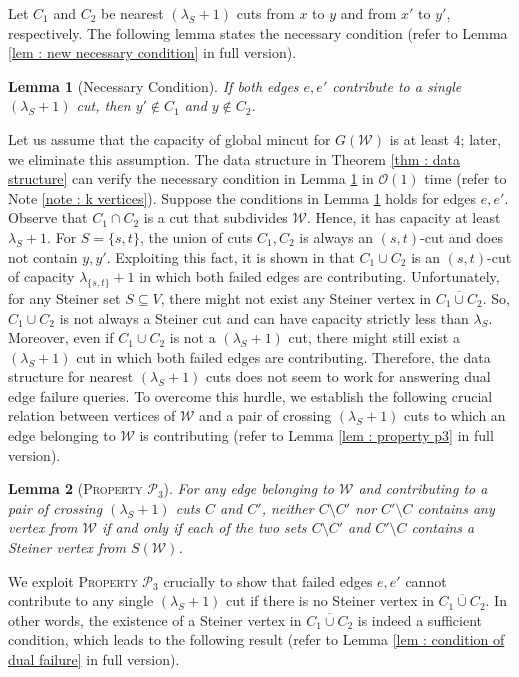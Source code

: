 \documentclass[letterpaper,11pt]{article}
\newtheorem{lemma}{Lemma}[]
\begin{document}
 Let $C_1$ and $C_2$ be nearest $(\lambda_S+1)$ cuts from $x$ to $y$ and from $x'$ to $y'$, respectively. The following lemma states the necessary condition (refer to Lemma \ref{lem : new necessary condition} in full version). 
 \begin{lemma} [Necessary Condition] \label{lem : overview : necessary condition}
     If both edges $e,e'$ contribute to a single $(\lambda_S+1)$ cut, then $y'\notin C_1$ and $y\notin C_2$.
 \end{lemma}
Let us assume that the capacity of global mincut for $G({\mathcal W})$ is at least $4$; later, we eliminate this assumption. The data structure in Theorem \ref{thm : data structure} can verify the necessary condition in Lemma \ref{lem : overview : necessary condition} in ${\mathcal O}(1)$ time (refer to Note \ref{note : k vertices}). 
 Suppose the conditions in Lemma \ref{lem : overview : necessary condition} holds for edges $e,e'$. Observe that $C_1\cap C_2$ is a cut that subdivides ${\mathcal W}$. Hence, it has capacity at least $\lambda_S+1$. For $S=\{s,t\}$, the union of cuts $C_1,C_2$ is always an $(s,t)$-cut and does not contain $y,y'$. Exploiting this fact, it is shown in \cite{DBLP:journals/talg/BaswanaBP23} that $C_1\cup C_2$ is an $(s,t)$-cut of capacity $\lambda_{\{s,t\}}+1$ in which both failed edges are contributing. Unfortunately, for any Steiner set $S\subseteq V$, there might not exist any Steiner vertex in $\overline{C_1\cup C_2}$. So, $C_1\cup C_2$ is not always a Steiner cut and can have capacity strictly less than $\lambda_S$.
Moreover, even if $C_1\cup C_2$ is not a $(\lambda_S+1)$ cut, there might still exist a $(\lambda_S+1)$ cut in which both failed edges are contributing. Therefore, the data structure for nearest $(\lambda_S+1)$ cuts does not seem to work for answering dual edge failure queries. To overcome this hurdle, we establish the following crucial relation between vertices of ${\mathcal W}$ and a pair of crossing $(\lambda_S+1)$ cuts to which an edge belonging to ${\mathcal W}$ is contributing (refer to Lemma \ref{lem : property p3} in full version).
\begin{lemma}
    [\textsc{Property ${\mathcal P}_3$}] For any edge belonging to ${\mathcal W}$ and contributing to a pair of crossing $(\lambda_S+1)$ cuts $C$ and $C'$, neither $C\setminus C'$ nor $C'\setminus C$ contains any vertex from ${\mathcal W}$ if and only if each of the two sets $C\setminus C'$ and $C'\setminus C$ contains a Steiner vertex from $S({\mathcal W})$.
\end{lemma}
We exploit \textsc{Property ${\mathcal P}_3$} crucially to show that failed edges $e,e'$ cannot contribute to any single $(\lambda_S+1)$ cut if there is no Steiner vertex in $\overline{C_1\cup C_2}$. In other words, the existence of a Steiner vertex in $\overline{C_1\cup C_2}$ is indeed a sufficient condition, which leads to the following result (refer to Lemma \ref{lem : condition of dual failure} in full version).
\end{document}
